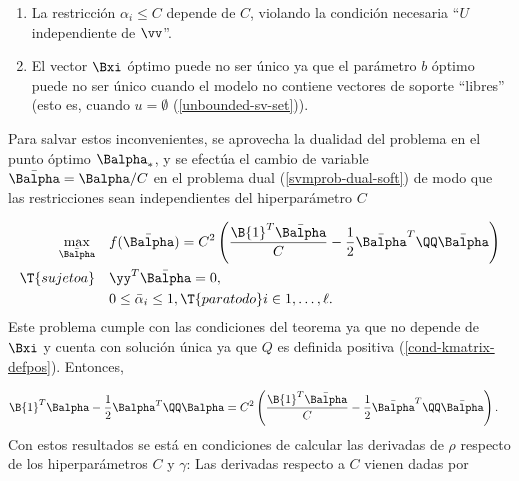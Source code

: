 \begin{enumerate}
\item La restricción $\alpha_i\leq{}C$ depende de $C$, violando la condición
  necesaria ``$U$ independiente de $\vv$''.
\item El vector $\Bxi$ óptimo puede no ser único ya que el parámetro $b$ óptimo
  puede no ser único cuando el modelo no contiene vectores de soporte
  ``libres'' (esto es, cuando $u=\emptyset$ (\ref{unbounded-sv-set})).
\end{enumerate}
Para salvar estos inconvenientes, se aprovecha la dualidad del
problema en el punto óptimo $\Balpha_*$, y se efectúa el cambio de
variable $\bar{\Balpha}=\Balpha/C$ en el problema dual
(\ref{svmprob-dual-soft}) de modo que las restricciones sean
independientes del hiperparámetro $C$

\begin{align}
\begin{split}
    \max_{\bar{\Balpha}}\quad&
    f(\bar{\Balpha}) = C^2 \left( \frac{\B{1}^T\bar{\Balpha}}{C}
    -\frac{1}{2}\bar{\Balpha}^T\QQ\bar{\Balpha}\right)\\
    \T{sujeto a}\quad & \yy^T\bar{\Balpha} = 0, \\
    & 0\leq\bar{\alpha}_i\leq 1,
    \T{ para todo } i\in {1,\ldots,\ell }.
\end{split}\end{align}
Este problema cumple con las condiciones del teorema ya que
no depende de $\Bxi$ y cuenta con solución única
ya que $Q$ es definida positiva (\ref{cond-kmatrix-defpos}). Entonces,

\begin{align}
\label{eq:rmb-alpha-equiv}
  \B{1}^T\Balpha-\frac{1}{2}\Balpha^T\QQ\Balpha
  &= C^2\left(\frac{\B{1}^T\bar{\Balpha}}{C} -
  \frac{1}{2}\bar{\Balpha}^T\QQ\bar{\Balpha}\right).
\end{align}
Con estos resultados se está en condiciones de calcular las derivadas de
$\rho$ respecto de los hiperparámetros $C$ y $\gamma$:
Las derivadas respecto a $C$ vienen dadas por

